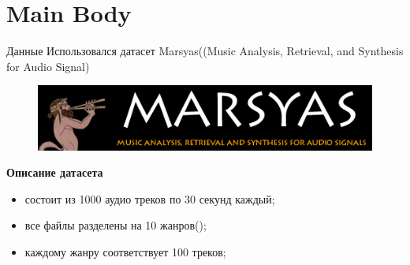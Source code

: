 \documentclass[xcolor=svgnames,handout]{beamer}
\begin{document}
\section
  {Main Body}
  
\begin{frame}
  {Данные}
  Использовался датасет Marsyas((Music Analysis, Retrieval, and Synthesis for Audio Signal)
    
  \begin{figure}[t]
    \centering
    \includegraphics[width = 0.95\linewidth]{header}
  \end{figure}
  
  \textbf{Описание датасета}
  \begin{itemize}
      \item состоит из 1000 аудио треков по 30 секунд каждый;
      \item все файлы разделены на 10 жанров();
      \item каждому жанру соответствует 100 треков;
  \end{itemize}


\end{frame}
\end{document}
